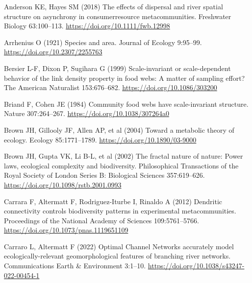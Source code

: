 \documentclass[
  12pt,
]{article}
\newlength{\cslhangindent}
\newlength{\cslentryspacingunit} %
\newenvironment{CSLReferences}[2] %
 {%
  \setlength{\parindent}{0pt}
  \ifodd #1
  \let\oldpar\par
  \def\par{\hangindent=\cslhangindent\oldpar}
  \fi
  \setlength{\parskip}{#2\cslentryspacingunit}
 }%
 {}
\begin{document}
\hypertarget{refs}{}
\begin{CSLReferences}{1}{0}
\leavevmode{}%
Anderson KE, Hayes SM (2018) The effects of dispersal and river spatial structure on asynchrony in consumer\textendash resource metacommunities. Freshwater Biology 63:100--113. \url{https://doi.org/10.1111/fwb.12998}

\leavevmode{}%
Arrhenius O (1921) Species and area. Journal of Ecology 9:95--99. \url{https://doi.org/10.2307/2255763}

\leavevmode{}%
Bersier L-F, Dixon P, Sugihara G (1999) Scale-invariant or scale-dependent behavior of the link density property in food webs: A matter of sampling effort? The American Naturalist 153:676--682. \url{https://doi.org/10.1086/303200}

\leavevmode{}%
Briand F, Cohen JE (1984) Community food webs have scale-invariant structure. Nature 307:264--267. \url{https://doi.org/10.1038/307264a0}

\leavevmode{}%
Brown JH, Gillooly JF, Allen AP, et al (2004) Toward a metabolic theory of ecology. Ecology 85:1771--1789. \url{https://doi.org/10.1890/03-9000}

\leavevmode{}%
Brown JH, Gupta VK, Li B-L, et al (2002) The fractal nature of nature: Power laws, ecological complexity and biodiversity. Philosophical Transactions of the Royal Society of London Series B: Biological Sciences 357:619--626. \url{https://doi.org/10.1098/rstb.2001.0993}

\leavevmode{}%
Carrara F, Altermatt F, Rodriguez-Iturbe I, Rinaldo A (2012) Dendritic connectivity controls biodiversity patterns in experimental metacommunities. Proceedings of the National Academy of Sciences 109:5761--5766. \url{https://doi.org/10.1073/pnas.1119651109}

\leavevmode{}%
Carraro L, Altermatt F (2022) Optimal {Channel Networks} accurately model ecologically-relevant geomorphological features of branching river networks. Communications Earth \& Environment 3:1--10. \url{https://doi.org/10.1038/s43247-022-00454-1}


\end{CSLReferences}
\end{document}
